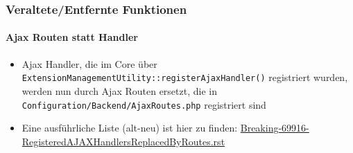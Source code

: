 %

\begin{frame}[fragile]
	\frametitle{Veraltete/Entfernte Funktionen}
	\framesubtitle{Ajax Routen statt Handler}

	\begin{itemize}

		\item Ajax Handler, die im Core über
			\texttt{ExtensionManagementUtility::registerAjaxHandler()}
			registriert wurden, werden nun durch Ajax Routen ersetzt,
			die in \texttt{ Configuration/Backend/AjaxRoutes.php} registriert sind

		\item Eine ausführliche Liste (alt-neu) ist hier zu finden:\newline
				\href{https://forge.typo3.org/projects/typo3cms-core/repository/revisions/3f0fb6229ba391356e5ed4984eb1c9418ba6663e/entry/typo3/sysext/core/Documentation/Changelog/master/Breaking-69916-RegisteredAJAXHandlersReplacedByRoutes.rst}{Breaking-69916-RegisteredAJAXHandlersReplacedByRoutes.rst}
	\end{itemize}

\end{frame}


